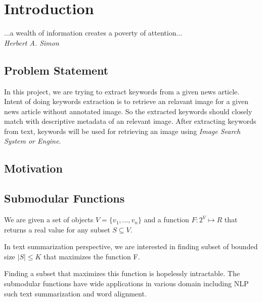 \chapter{Introduction} 

\begin{center} ...a wealth of information creates a poverty of attention...\\
\textit{Herbert A. Simon}
\end{center}

\section{Problem Statement}

In this project, we are trying to extract keywords from a given news article. Intent of doing keywords extraction is to retrieve an relavant image for a given news article without annotated image. So the extracted keywords should closely match with descriptive metadata of an relevant image. After extracting keywords from text, keywords will be used for retrieving an image using \textit{Image Search System or Engine}.

\section{Motivation}

\section{Submodular Functions}

We are given a set of objects $V = \{v_1,...,v_n\}$ and a
function $F : 2^{V} \mapsto R$ that returns a real value for any subset $S \subseteq V$.


In text summarization perspective, we are interested in finding subset of bounded size $|S| \leq K $ that maximizes the function F.


Finding a subset that maximizes this function is hopelessly intractable. The submodular functions have wide applications in various domain including NLP such text summarization and word alignment.

